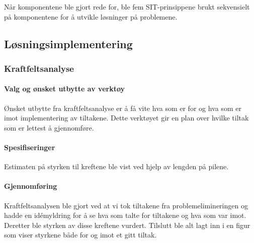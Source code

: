 Når komponentene ble gjort rede for, ble fem SIT-prinsippene brukt sekvensielt på komponentene for å utvikle løsninger på problemene. 

\subsection{Løsningsimplementering}
\subsubsection{Kraftfeltsanalyse}

\paragraph{Valg og ønsket utbytte av verktøy}
Ønsket utbytte fra kraftfeltsanalyse er å få vite hva som er for og hva som er imot implementering av tiltakene. Dette verktøyet gir en plan over hvilke tiltak som er lettest å gjennomføre.

\paragraph{Spesifiseringer}
Estimaten på styrken til kreftene ble vist ved hjelp av lengden på pilene.

\paragraph{Gjennomføring}
Kraftfeltsanalysen ble gjort ved at vi tok tiltakene fra problemelimineringen og hadde en idémyldring for å se hva som talte for tiltakene og hva som var imot. Deretter ble styrken av disse kreftene vurdert. Tilslutt ble alt lagt inn i en figur som viser styrkene både for og imot et gitt tiltak. 
